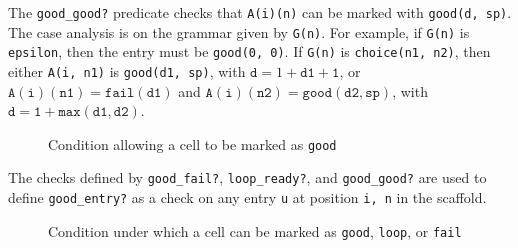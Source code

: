 \documentclass[sigplan,10pt,anonymous,review]{acmart}\settopmatter{printfolios=true,printccs=false,printacmref=false}
\begin{document}
\begin{CCSXML}
%   

                      
                      
% 			

                      The \texttt{good\_good?} predicate checks that \texttt{A(i)(n)} can be marked
                      with \texttt{good(d, sp)}\@.  The case analysis is on the grammar given by \texttt{G(n)}\@.  For example, if \texttt{G(n)} is \texttt{epsilon}, then the entry must be \texttt{good(0, 0)}\@.  If \texttt{G(n)} is \texttt{choice(n1, n2)}, then either \texttt{A(i, n1)} is \texttt{good(d1, sp)}, with $\mathtt{d} = 1 + \mathtt{d1 + 1}$, or
$\mathtt{A(i)(n1)} = \mathtt{fail(d1)}$ and $\mathtt{A(i)(n2)} = \mathtt{good(d2, sp)}$, with $\mathtt{d} = \mathtt{1 + max(d1, d2)}$\@.  
                      

\begin{figure}[h!]
  
    \vspace*{-4mm}
			\caption{Condition allowing a cell to be marked as \texttt{good}}
			\label{pvs:goodgood}
\end{figure}

The checks defined by \texttt{good\_fail?}, \texttt{loop\_ready?}, and \texttt{good\_good?} are used to define \texttt{good\_entry?} as a check on any entry \texttt{u}
at position \texttt{i, n} in the scaffold.  

\begin{figure}[h!]
  
    \vspace*{-4mm}
\caption{Condition under which a cell can be marked as \texttt{good},
  \texttt{loop}, or \texttt{fail}}
\label{pvs:goodentry}
\end{figure}


\end{CCSXML}
\end{document}

